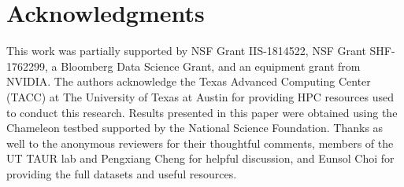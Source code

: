 \documentclass[11pt,a4paper]{article}
\begin{document}
\section*{Acknowledgments}

This work was partially supported by NSF Grant IIS-1814522, NSF Grant SHF-1762299, a Bloomberg Data Science Grant, and an equipment grant from NVIDIA. The authors acknowledge the Texas Advanced Computing Center (TACC) at The University of Texas at Austin for providing HPC resources used to conduct this research. Results presented in this paper were obtained using the Chameleon testbed supported by the National Science Foundation. Thanks as well to the anonymous reviewers for their thoughtful comments, members of the UT TAUR lab and Pengxiang Cheng for helpful discussion, and Eunsol Choi for providing the full datasets and useful resources.



\end{document}

